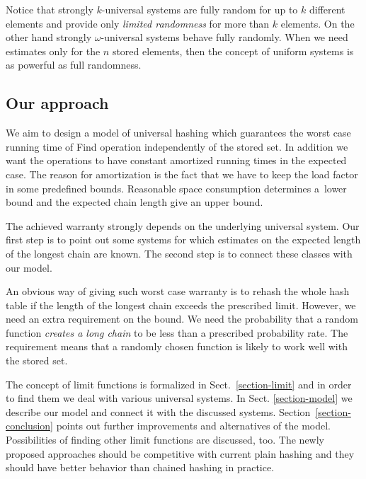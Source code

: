 Notice that strongly $k$-universal systems are fully random for up to $k$ different elements and provide only \emph{limited randomness} for more than $k$ elements. On the other hand strongly $\omega$-universal systems behave fully randomly. When we need estimates only for the $n$ stored elements, then the concept of uniform systems is as powerful as full randomness.

\subsection{Our approach}
We aim to design a model of universal hashing which guarantees the worst case running time of Find operation independently of the stored set. In addition we want the operations to have constant amortized running times in the expected case. The reason for amortization is the fact that we have to keep the load factor in some predefined bounds. Reasonable space consumption determines a~lower bound and the expected chain length give an upper bound.

The achieved warranty strongly depends on the underlying universal system. Our first step is to point out some systems for which estimates on the expected length of the longest chain are known. The second step is to connect these classes with our model.

An obvious way of giving such worst case warranty is to rehash the whole hash table if the length of the longest chain exceeds the prescribed limit. However, we need an extra requirement on the bound. We need the probability that a random function \emph{creates a long chain} to be less than a prescribed probability rate. The requirement means that a randomly chosen function is likely to work well with the stored set.

The concept of limit functions is formalized in Sect.~\ref{section-limit} and in order to find them we deal with various universal systems. In Sect. \ref{section-model} we describe our model and connect it with the discussed systems. Section~\ref{section-conclusion} points out further improvements and alternatives of the model. Possibilities of finding other limit functions are discussed, too. The newly proposed approaches should be competitive with current plain hashing and they should have better behavior than chained hashing in practice.
